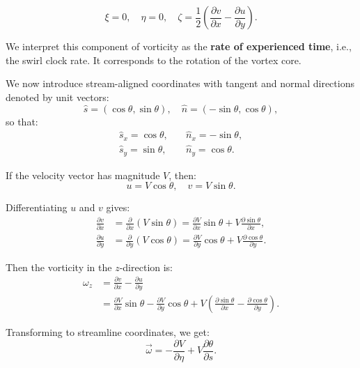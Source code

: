 \documentclass[a4paper,12pt]{article}
\begin{document}
    \begin{equation}
        \xi = 0, \quad \eta = 0, \quad \zeta = \frac{1}{2} \left( \frac{\partial v}{\partial x} - \frac{\partial u}{\partial y} \right).
    \end{equation}

    We interpret this component of vorticity as the \textbf{rate of experienced time}, i.e., the swirl clock rate. It corresponds to the rotation of the vortex core.

    We now introduce stream-aligned coordinates with tangent and normal directions denoted by unit vectors:
    \[
        \hat{s} = (\cos \theta, \sin \theta), \quad
        \hat{n} = (-\sin \theta, \cos \theta),
    \]
    so that:
    \begin{align}
        \hat{s}_x = \cos \theta, &\quad \hat{n}_x = -\sin \theta, \\
        \hat{s}_y = \sin \theta, &\quad \hat{n}_y = \cos \theta.
    \end{align}

    If the velocity vector has magnitude \(V\), then:
    \begin{equation}
        u = V \cos \theta, \quad
        v = V \sin \theta.
    \end{equation}

    Differentiating \(u\) and \(v\) gives:
    \begin{align}
        \frac{\partial v}{\partial x} &= \frac{\partial}{\partial x} (V \sin \theta) = \frac{\partial V}{\partial x} \sin \theta + V \frac{\partial \sin \theta}{\partial x}, \\
        \frac{\partial u}{\partial y} &= \frac{\partial}{\partial y} (V \cos \theta) = \frac{\partial V}{\partial y} \cos \theta + V \frac{\partial \cos \theta}{\partial y}.
    \end{align}

    Then the vorticity in the \(z\)-direction is:
    \begin{align}
        \omega_z &= \frac{\partial v}{\partial x} - \frac{\partial u}{\partial y} \\
        &= \frac{\partial V}{\partial x} \sin \theta - \frac{\partial V}{\partial y} \cos \theta
        + V \left( \frac{\partial \sin \theta}{\partial x} - \frac{\partial \cos \theta}{\partial y} \right).
    \end{align}

    Transforming to streamline coordinates, we get:
    \begin{equation}
        \vec{\omega} = -\frac{\partial V}{\partial \eta} + V \frac{\partial \theta}{\partial s}.
    \end{equation}
\end{document}
